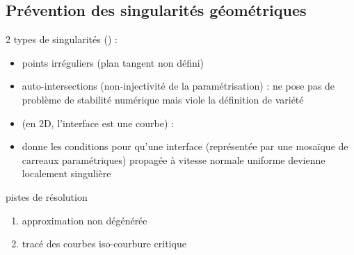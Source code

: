 \subsection{Prévention des singularités géométriques}

2 types de singularités (\cite[p.320]{patrikalakis2009}) :
\begin{itemize}
	\item points irréguliers (plan tangent non défini)
	\item auto-intersections (non-injectivité de la paramétrisation) : ne pose pas de problème de stabilité numérique mais viole la définition de variété
\end{itemize}

\begin{itemize}
	\item \cite{jiao2001} (en 2D, \ie l'interface est une courbe) : 
	\item \cite{farouki1986} donne les conditions pour qu'une interface (représentée par une mosaïque de carreaux paramétriques) propagée à vitesse normale uniforme devienne localement singulière
\end{itemize}

pistes de résolution
\begin{enumerate}
	\item approximation non dégénérée \cite{farouki1986}
	\item tracé des courbes iso-courbure critique 
\end{enumerate}


